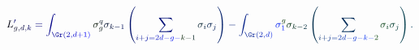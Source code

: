 \documentclass[12pt]{article}
\begin{document}
\makeatletter
\renewcommand*{\@textcolor}[3]{%
  \protect\leavevmode
  \begingroup
    \color#1{#2}#3%
  \endgroup
}
\makeatother
\begin{displaymath}
\mathcolor[RGB]{0,0,15}{L} _ { \mathcolor[RGB]{0,0,30}{g} \mathcolor[RGB]{0,0,45}{,} \mathcolor[RGB]{0,0,60}{d} \mathcolor[RGB]{0,0,75}{,} \mathcolor[RGB]{0,0,90}{k} } ^ { \mathcolor[RGB]{0,0,105}{\prime} } \mathcolor[RGB]{0,0,120}{=} \mathcolor[RGB]{0,0,135}{\int} _ { \mathcolor[RGB]{0,0,150}{\Gr} \mathcolor[RGB]{0,0,165}{(} \mathcolor[RGB]{0,0,180}{2} \mathcolor[RGB]{0,0,195}{,} \mathcolor[RGB]{0,0,210}{d} \mathcolor[RGB]{0,0,225}{+} \mathcolor[RGB]{0,0,240}{1} \mathcolor[RGB]{0,0,255}{)} } \mathcolor[RGB]{0,15,0}{\sigma} _ { \mathcolor[RGB]{0,15,15}{g} } ^ { \mathcolor[RGB]{0,15,30}{q} } \mathcolor[RGB]{0,15,45}{\sigma} _ { \mathcolor[RGB]{0,15,60}{k} \mathcolor[RGB]{0,15,75}{-} \mathcolor[RGB]{0,15,90}{1} } \mathcolor[RGB]{0,15,105}{\left(} \mathcolor[RGB]{0,15,120}{\sum} _ { \mathcolor[RGB]{0,15,135}{i} \mathcolor[RGB]{0,15,150}{+} \mathcolor[RGB]{0,15,165}{j} \mathcolor[RGB]{0,15,180}{=} \mathcolor[RGB]{0,15,195}{2} \mathcolor[RGB]{0,15,210}{d} \mathcolor[RGB]{0,15,225}{-} \mathcolor[RGB]{0,15,240}{g} \mathcolor[RGB]{0,15,255}{-} \mathcolor[RGB]{0,30,0}{k} \mathcolor[RGB]{0,30,15}{-} \mathcolor[RGB]{0,30,30}{1} } \mathcolor[RGB]{0,30,45}{\sigma} _ { \mathcolor[RGB]{0,30,60}{i} } \mathcolor[RGB]{0,30,75}{\sigma} _ { \mathcolor[RGB]{0,30,90}{j} } \mathcolor[RGB]{0,30,105}{\right)} \mathcolor[RGB]{0,30,120}{-} \mathcolor[RGB]{0,30,135}{\int} _ { \mathcolor[RGB]{0,30,150}{\Gr} \mathcolor[RGB]{0,30,165}{(} \mathcolor[RGB]{0,30,180}{2} \mathcolor[RGB]{0,30,195}{,} \mathcolor[RGB]{0,30,210}{d} \mathcolor[RGB]{0,30,225}{)} } \mathcolor[RGB]{0,30,240}{\sigma} _ { \mathcolor[RGB]{0,30,255}{1} } ^ { \mathcolor[RGB]{0,45,0}{g} } \mathcolor[RGB]{0,45,15}{\sigma} _ { \mathcolor[RGB]{0,45,30}{k} \mathcolor[RGB]{0,45,45}{-} \mathcolor[RGB]{0,45,60}{2} } \mathcolor[RGB]{0,45,75}{\left(} \mathcolor[RGB]{0,45,90}{\sum} _ { \mathcolor[RGB]{0,45,105}{i} \mathcolor[RGB]{0,45,120}{+} \mathcolor[RGB]{0,45,135}{j} \mathcolor[RGB]{0,45,150}{=} \mathcolor[RGB]{0,45,165}{2} \mathcolor[RGB]{0,45,180}{d} \mathcolor[RGB]{0,45,195}{-} \mathcolor[RGB]{0,45,210}{g} \mathcolor[RGB]{0,45,225}{-} \mathcolor[RGB]{0,45,240}{k} \mathcolor[RGB]{0,45,255}{-} \mathcolor[RGB]{0,60,0}{2} } \mathcolor[RGB]{0,60,15}{\sigma} _ { \mathcolor[RGB]{0,60,30}{i} } \mathcolor[RGB]{0,60,45}{\sigma} _ { \mathcolor[RGB]{0,60,60}{j} } \mathcolor[RGB]{0,60,75}{\right)} \mathcolor[RGB]{0,60,90}{.}
\end{displaymath}
\end{document}
